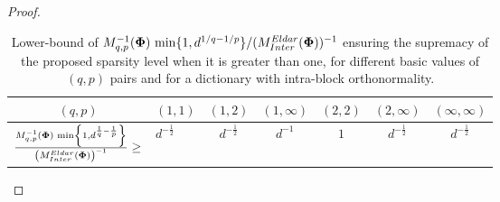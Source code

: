 \begin{proof}
\begin{table*}[tp]
\centering
\begin{tabular}{ccccccc}
\toprule
\multicolumn{1}{c}{$(q ,p )$} &\multicolumn{1}{c}{$(1,1)$} & \multicolumn{1}{c}{$(1,2)$}  & \multicolumn{1}{c}{$(1,\infty)$} & \multicolumn{1}{c}{$(2,2)$} & \multicolumn{1}{c}{$(2,\infty)$} & \multicolumn{1}{c}{$(\infty,\infty)$}\\ \midrule %
\multicolumn{1}{c}{$\frac{M_{q,p}^{-1}\left( \boldsymbol{\Phi} \right) \, \min \left\lbrace 1 , d^{\frac1q - \frac1p} \right\rbrace}{\left( M^{Eldar}_{Inter}\left( \boldsymbol{\Phi} \right) \right) ^{-1}}  \geq$} &\multicolumn{1}{l}{$d^{-\frac12}$} & \multicolumn{1}{c}{$d^{-\frac12}$} & \multicolumn{1}{c}{$d^{-1}$} &\multicolumn{1}{c}{$1$} &\multicolumn{1}{c}{$d^{-\frac12}$} & \multicolumn{1}{c}{$d^{-\frac12}$}   \\ \bottomrule %
\end{tabular}
\caption{Lower-bound of $M_{q,p}^{-1}(\boldsymbol{\Phi}) \, \min \{1 , d^{1/q {-} 1/p} \} / (M^{Eldar}_{Inter}(\boldsymbol{\Phi})) ^{-1}$ ensuring the supremacy of the proposed sparsity level when it is greater than one, for different basic values of $(q,p)$ pairs and for a dictionary with intra-block orthonormality.}
\label{table:BMCC-EldarBMCC}
\end{table*}
%
\end{proof}